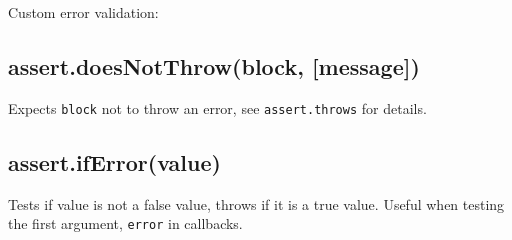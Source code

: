 Custom error validation:

\begin{Shaded}
\begin{Highlighting}[]
\NormalTok{(}
  \NormalTok{() \{}
      \NormalTok{(}\NormalTok{);}
  \NormalTok{\},}
      
       \NormalTok{;}
    \NormalTok{\}}
  \NormalTok{\},}
\NormalTok{);}
\end{Highlighting}
\end{Shaded}

\subsection{assert.doesNotThrow(block,
{[}message{]})}\label{assert.doesnotthrowblock-message}

Expects \texttt{block} not to throw an error, see \texttt{assert.throws}
for details.

\subsection{assert.ifError(value)}\label{assert.iferrorvalue}

Tests if value is not a false value, throws if it is a true value.
Useful when testing the first argument, \texttt{error} in callbacks.
